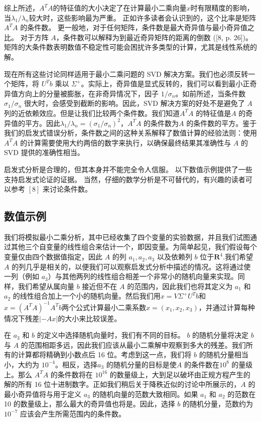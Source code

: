 \documentclass[11pt,a4paper,twoside]{article}
\begin{document}
\begin{CJK}{UTF8}{gbsn}
综上所述，$A^{T} A$的特征值的大小决定了在计算最小二乘向量$x$时有限精度的影响，当$\lambda_{1} / \lambda_{n}$较大时，这些影响最为严重。 正如许多读者会认识到的，这个比率是矩阵 $A^{T} A$ 的条件数。 更一般地，对于任何矩阵，条件数是最大奇异值与最小奇异值之比。 对于方阵 $A$，条件数可以解释为到最近奇异矩阵的距离的倒数 ([8, p. 26])。 矩阵的大条件数表明数值不稳定性可能会困扰许多类型的计算，尤其是线性系统的解。

现在所有这些讨论同样适用于最小二乘问题的 SVD 解决方案。我们也必须反转一个矩阵，将 $U^{T} b$ 乘以 $\Sigma^{+}$。实际上，奇异值是显式反转的，我们可以看到最小正奇异值方向上的分量被膨胀，在非奇异情况下，因子 $1 / \sigma_{n}$。如前所述，当条件数 $\sigma_{1} / \sigma_{n}$ 很大时，会感受到截断的影响。因此，SVD 解决方案的好处不是避免了 $A$ 列的近依赖效应。但是让我们比较两个条件数。我们知道$A^{T} A$ 的特征值是$A$ 的奇异值的平方。因此$\lambda_{1} / \lambda_{n}=\left(\sigma_{1} / \sigma_{n}\right)^{2}$，$A^{T} A$ 的条件数为$A$ 的条件数的平方。鉴于我们的启发式错误分析，条件数之间的这种关系解释了数值计算的经验法则：使用 $A^{T} A$ 的计算需要使用大约两倍的数字来执行，以确保最终结果其准确性与 $A$ 的 SVD 提供的准确性相当。

启发式分析是合理的，但其本身并不能完全令人信服。 以下数值示例提供了一些支持启发式论证的证据。 当然，仔细的数学分析是不可替代的，有兴趣的读者可以参考 $[8]$ 来讨论条件数。

\subsection{数值示例}
我们将模拟最小二乘分析，其中已经收集了四个变量的实验数据，并且我们试图通过其他三个自变量的线性组合来估计一个，即因变量。为简单起见，我们假设每个变量仅由四个数据值指定，因此 $A$ 的列 $a_{1},a_{2},a_{3}$ 以及依赖列 $b$ 位于$\mathbf{R}^{4}$.我们希望 $A$ 的列几乎是相关的，以便我们可以观察启发式分析中描述的情况。这将通过使一列（例如 $a_{3}$）与其他两列的线性组合相差一个非常小的随机向量来实现。同样，我们希望从属向量 $b$ 接近但不在 $A$ 的范围内，因此我们也将其定义为 $a_{1}$ 和 $a_{2} $ 的线性组合加上一个小的随机向量。然后我们用$x=V \Sigma^{+} U^{T} b$和$x=\left(A^{T} A\right)^{-1} A^{T} b$两个公式计算最小二乘系数$x=\left(x_{1}, x_{2}, x_{3}\right)$，并通过计算每种情况下残差$| -A x|$的大小来比较误差。

在 $a_{3}$ 和 $b$ 的定义中选择随机向量时，我们有不同的目标。 $b$ 的随机分量将决定 $b$ 与 $A$ 的范围相距多远，因此我们应该从最小二乘解中观察到多大的残差。我们所有的计算都将精确到小数点后 16 位。考虑到这一点，我们将 $b$ 的随机分量相当小，大约为 $10^{-4}$。相反，选择$a_{3}$ 的随机分量的目标是使$A$ 的条件数在$10^{8}$ 的量级上。那么 $A^{T} A$ 的条件数将在 $10^{16}$ 的数量级上，大到足以破坏由正规方程产生的解的所有 16 位十进制数字。正如我们稍后关于降秩近似的讨论中所展示的，$A$ 的最小奇异值将与用于定义 $a_{3}$ 的随机向量的范数大致相同。如果 $a_{1}$ 和 $a_{2}$ 的范数在 10 的数量级上，那么最大的奇异值也将是。因此，选择 $b$ 的随机分量，范数约为 $10^{-7}$ 应该会产生所需范围内的条件数。


\end{CJK}
\end{document}

